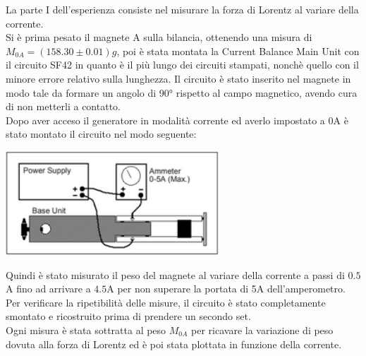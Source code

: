 {\fontsize{12}{14}\selectfont 

La parte I dell'esperienza consiste nel misurare la forza di Lorentz al variare della corrente. 
\\
Si è prima pesato il magnete A sulla bilancia, ottenendo una misura di $M_{0A} = (158.30 \pm 0.01)g$, poi è stata montata la Current Balance Main Unit con il circuito SF42 in quanto è il più lungo dei circuiti stampati, nonchè quello con il minore errore relativo sulla lunghezza.
Il circuito è stato inserito nel magnete in modo tale da formare un angolo di 90° rispetto al campo magnetico, avendo cura di non metterli a contatto.
\\
Dopo aver acceso il generatore in modalità corrente ed averlo impostato a 0A è stato montato il circuito nel modo seguente:

\par
\begin{center}
    \includegraphics[width=8cm]{Figures/Circuito.png}
\end{center}
\par

Quindi è stato misurato il peso del magnete al variare della corrente a passi di $0.5$A fino ad arrivare a $4.5$A per non superare la portata di 5A dell'amperometro. 
\\
Per verificare la ripetibilità delle misure, il circuito è stato completamente smontato e ricostruito prima di prendere un secondo set.
\\
Ogni misura è stata sottratta al peso $M_{0A}$ per ricavare la variazione di peso dovuta alla forza di Lorentz ed è poi stata plottata in funzione della corrente.
\par}